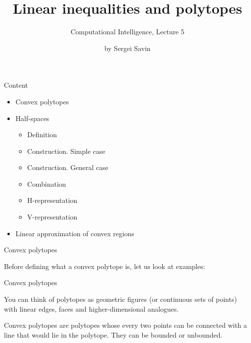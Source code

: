 \documentclass{beamer}
\title{Linear inequalities and polytopes}
\subtitle{Computational Intelligence, Lecture 5}
\author{by Sergei Savin}
\date{\mydate}
\begin{document}
\maketitle


\begin{frame}{Content}

\begin{itemize}
\item Convex polytopes
\item Half-spaces
\begin{itemize}
\item Definition
\item Construction. Simple case
\item Construction. General case
\item Combination
\item H-representation
\item V-representation
\end{itemize}
\item Linear approximation of convex regions
\end{itemize}

\end{frame}



\begin{frame}{Convex polytopes}
\begin{flushleft}

Before defining what a convex polytope is, let us look at examples:


 
\end{flushleft}
\end{frame}


\begin{frame}{Convex polytopes}
\begin{flushleft}

You can think of polytopes as geometric figures (or continuous sets of points) with linear edges, faces and higher-dimensional analogues.

\bigskip

\begin{definition}
 Convex polytopes are polytopes whose every two points can be connected with a line that would lie in the polytope. They can be bounded or unbounded.
\end{definition}
 
\end{flushleft}
\end{frame}
\end{document}
